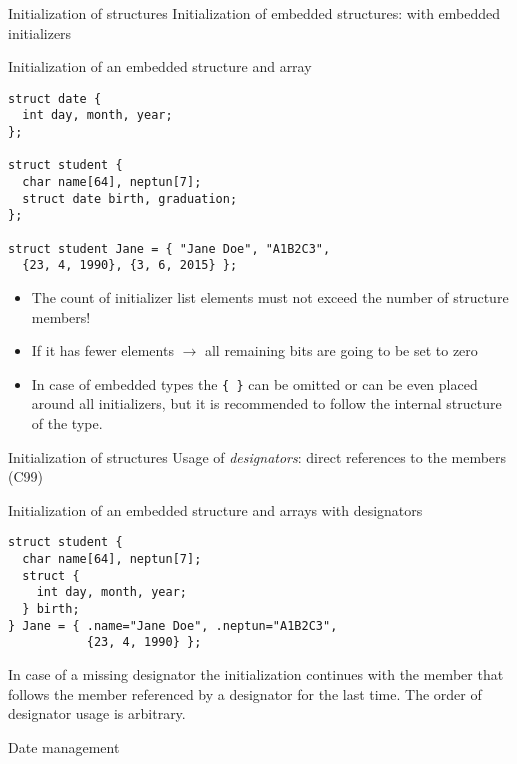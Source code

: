 \documentclass[usenames,dvipsnames,aspectratio=169]{beamer}
\begin{document}
\begin{frame}[fragile]{Initialization of structures}
  \small
  Initialization of embedded structures: with embedded initializers
  \begin{exampleblock}{Initialization of an embedded structure and array}
    \scriptsize
    \begin{verbatim}
struct date {
  int day, month, year;
};

struct student {
  char name[64], neptun[7];
  struct date birth, graduation;
};

struct student Jane = { "Jane Doe", "A1B2C3", 
  {23, 4, 1990}, {3, 6, 2015} };
\end{verbatim}
  \end{exampleblock}
  \begin{itemize}
    \item The count of initializer list elements must not exceed the number of structure members!
    \item If it has fewer elements $\to$ all remaining bits are going to be set to zero
    \item In case of embedded types the \texttt{\{ \}} can be omitted or can be even placed around all initializers, but it is recommended to follow the internal structure of the type.
  \end{itemize}
\end{frame}

\begin{frame}[fragile]{Initialization of structures}
  Usage of \emph{designators}: direct references to the members (C99)
  \begin{exampleblock}{Initialization of an embedded structure and arrays with designators}
    \footnotesize
    \begin{verbatim}
struct student {
  char name[64], neptun[7];
  struct {
    int day, month, year;
  } birth;
} Jane = { .name="Jane Doe", .neptun="A1B2C3",
           {23, 4, 1990} };
\end{verbatim}
  \end{exampleblock}
  In case of a missing designator the initialization continues with the member that follows the member referenced by a designator for the last time. The order of designator usage is arbitrary.
\end{frame}

\begin{frame}{Date management}
  \begin{exampleblock}{}
    \scriptsize
    
  \end{exampleblock}
\end{frame}
\end{document}
